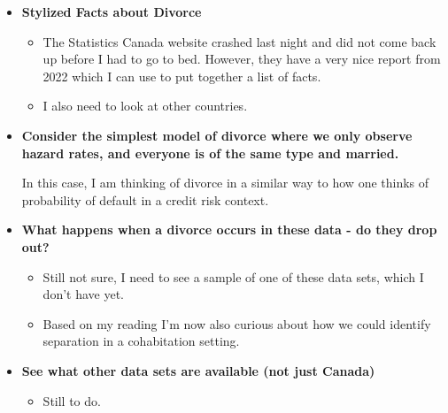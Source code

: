 \documentclass{article}
\begin{document}
\begin{itemize}
\item \textbf{Stylized Facts about Divorce}
\begin{itemize}
\item The Statistics Canada website crashed last night and did not come back up before I had to go to bed. However, they have a very nice report from 2022 which I can use to put together a list of facts.
\item I also need to look at other countries.
\end{itemize}

\item \textbf{Consider the simplest model of divorce where we only observe hazard rates, and everyone is of the same type and married.}

In this case, I am thinking of divorce in a similar way to how one thinks of probability of default in a credit risk context.


\item \textbf{What happens when a divorce occurs in these data - do they drop out?}
\begin{itemize}
\item Still not sure, I need to see a sample of one of these data sets, which I don't have yet.
\item Based on my reading I'm now also curious about how we could identify separation in a cohabitation setting.
\end{itemize}

\item \textbf{See what other data sets are available (not just Canada)}
\begin{itemize}
\item Still to do.
\end{itemize}

\end{itemize}

\newpage
\end{document}
